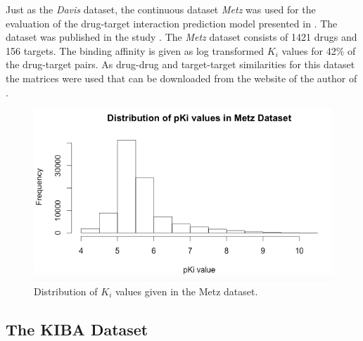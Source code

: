 Just as the \textit{Davis} dataset, the continuous dataset \textit{Metz} was used for the evaluation of the drug-target interaction prediction model presented in \cite{pahikkala2014toward}. The dataset was published in the study \cite{metz2011navigating}. The \textit{Metz} dataset consists of 1421 drugs and 156 targets. The binding affinity is given as log transformed $K_i$ values for 42$\%$ of the drug-target pairs. As drug-drug and target-target similarities for this dataset the matrices were used that can be downloaded from the website of the author of \cite{pahikkala2014toward}.
\begin{figure}
\begin{center}
\includegraphics[scale=0.6]{metz_dist.png}
\end{center}
\caption{Distribution of $K_i$ values given in the Metz dataset.}
\end{figure}

\subsection{The KIBA Dataset}

